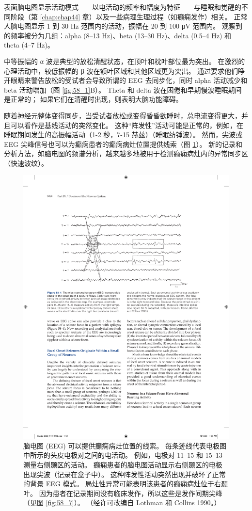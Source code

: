 表面脑电图显示活动模式——以电活动的频率和幅度为特征——与睡眠和觉醒的不同阶段（第 \ref{chap:chap44} 章）以及一些病理生理过程（如癫痫发作）相关。
正常人脑电图显示 1 到 30 Hz 范围内的活动，振幅在 20 到 100 μV 范围内。
观察到的频率被分为几组：alpha (8–13 Hz)、beta (13–30 Hz)、delta (0.5–4 Hz) 和 theta (4–7 Hz)。


中等振幅的 α 波是典型的放松清醒状态，在顶叶和枕叶部位最为突出。
在激烈的心理活动中，较低振幅的 β 波在额叶区域和其他区域更为突出。
通过要求他们睁开眼睛来警告放松的受试者会导致所谓的 EEG 去同步化，同时 alpha 活动减少和 beta 活动增加（图 \ref{fig:58_1}B）。
Theta 和 delta 波在困倦和早期慢波睡眠期间是正常的；
如果它们在清醒时出现，则表明大脑功能障碍。


随着神经元整体变得同步，当受试者放松或变得昏昏欲睡时，总电流变得更大，并且可以看作是基线活动的突然变化。
这种“阵发性”活动可能是正常的，例如，在睡眠期间发生的高振幅活动（1-2 秒，7-15 赫兹）（睡眠纺锤波）。
然而，尖波或 EEG 尖峰信号也可以为癫痫患者的癫痫病灶位置提供线索（图 \ref{fig:58_4}）。
新的记录和分析方法，如脑电图的频谱分析，越来越多地被用于检测癫痫病灶内的异常同步区（快速波纹）。


\begin{figure}[htbp]
	\centering
	\includegraphics[width=0.8\linewidth]{chap58/fig_58_4}
	\caption{脑电图 (EEG) 可以提供癫痫病灶位置的线索。 每条迹线代表电极图中所示的头皮电极对之间的电活动。 例如，电极对 11–15 和 15–13 测量右侧颞区的活动。 癫痫患者的脑电图活动显示右侧颞区的电极出现尖波（记录在盒子中）。 这种阵发性活动突然出现并破坏了正常的背景 EEG 模式。 局灶性异常可能表明该患者的癫痫病灶位于右颞叶。 因为患者在记录期间没有临床发作，所以这些是发作间期尖峰（见图 \ref{fig:58_7}）。 （经许可改编自 Lothman 和 Collins 1990。）}
	\label{fig:58_4}
\end{figure}



